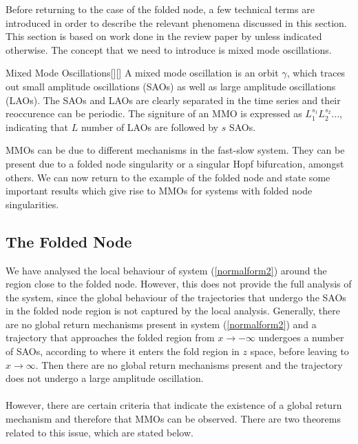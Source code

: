 \label{sec: MMO Oscilaltions} %

Before returning to the case of the folded node, a few technical terms are introduced in order to describe the relevant phenomena discussed in this section.
This section is based on work done in the review paper by \citep{MMO} unless indicated otherwise.
The concept that we need to introduce is mixed mode oscillations.
 
\begin{definition}{Mixed Mode Oscillations}[\citealp{kuehn}][\citealp{MMO}]
	A mixed mode oscillation is an orbit $\gamma$, which traces out small amplitude oscillations (SAOs) as well as large amplitude oscillations (LAOs).
	The SAOs and LAOs are clearly separated in the time series and their reoccurence can be periodic.
	The signiture of an MMO is expressed as $L_1^{s_1}L_2^{s_2}...$, indicating that $L$ number of LAOs are followed by $s$ SAOs.
\end{definition}
MMOs can be due to different mechanisms in the fast-slow system. They can be present due to a folded node singularity or a singular Hopf bifurcation, amongst others.
We can now return to the example of the folded node and state some important results which give rise to MMOs for systems with folded node singularities.

\subsection{The Folded Node}
We have analysed the local behaviour of system (\ref{normalform2}) around the region close to the folded node.
However, this does not provide the full analysis of the system, since the global behaviour of the trajectories that undergo the SAOs in the folded node region is not captured by the local analysis.
Generally, there are no global return mechanisms present in system (\ref{normalform2}) and a trajectory that approaches the folded region from $x \to - \infty$ undergoes a number of SAOs, according to where it enters the fold region in $z$ space, before leaving to $x \to  \infty$. Then there are no global return mechanisms present and the trajectory does not undergo a large amplitude oscillation.
\\
\\
However, there are certain criteria that indicate the existence of a global return mechanism and therefore that MMOs can be observed.
There are two theorems related to this issue, which are stated below.

